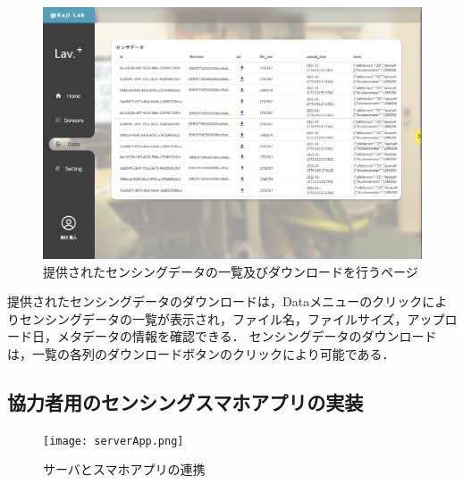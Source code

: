 \begin{figure}[H]
  \centering
  \includegraphics[width= 150mm]{Dashboard-SensingData.png}
  \caption{提供されたセンシングデータの一覧及びダウンロードを行うページ}
  \label{server}
\end{figure}

提供されたセンシングデータのダウンロードは，Dataメニューのクリックによりセンシングデータの一覧が表示され，ファイル名，ファイルサイズ，アップロード日，メタデータの情報を確認できる．
センシングデータのダウンロードは，一覧の各列のダウンロードボタンのクリックにより可能である．

\subsection{協力者用のセンシングスマホアプリの実装}

\begin{figure}[H]
  \centering
  \texttt{[image: serverApp.png]}
  \caption{サーバとスマホアプリの連携}
  \label{server}
\end{figure}


